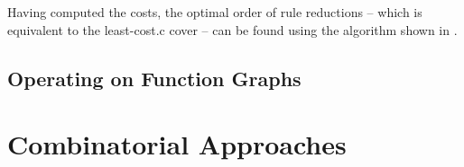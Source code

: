 Having computed the costs, the optimal order of \glspl{rule reduction} -- which
is equivalent to the \gls{least-cost.c} \gls{cover} -- can be found using the
algorithm shown in .




\subsection{Operating on Function Graphs}




\section{Combinatorial Approaches}

